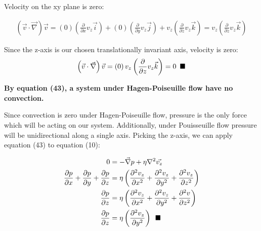 \documentclass[titlepage]{article}
\begin{document}
\noindent Velocity on the xy plane is zero:

\begin{align}
    \left(\vec{v}\cdot\vec{\nabla}\right)\vec{v}=\left(0\right)\left(\displaystyle\frac{\partial}{\partial{x}}v_{z}\vec{i}\right)+\left(0\right)\left(\displaystyle\frac{\partial}{\partial{y}}v_{z}\vec{j}\right)+v_{z}\left(\displaystyle\frac{\partial}{\partial{z}}v_{z}\vec{k}\right) 
    =v_{z}\left(\displaystyle\frac{\partial}{\partial{z}}v_{z}\vec{k}\right) 
\end{align}

\noindent Since the z-axis is our chosen translationally invariant axis, velocity is zero:
\begin{align}
    \left(\vec{v}\cdot\vec{\nabla}\right)\vec{v}=\left(0\right)v_{z}\left(\displaystyle\frac{\partial}{\partial{z}}v_{z}\vec{k}\right)=0\hspace*{5pt}\blacksquare
\end{align}

\noindent \textbf{By equation (43), a system under Hagen-Poiseuille flow have no convection.} 

\newpage
\noindent  Since convection is zero under Hagen-Poiseuille flow, pressure is the only force which will be acting on our system. Additionally, under Pouisseuille flow pressure will be unidirectional along a single axis. Picking the z-axis, we can apply equation (43) to equation (10): 

\begingroup
    \addtolength\jot{5pt}
    \begin{align}
        0&=-\vec{\nabla}p+\eta\nabla^2\vec{v_{z}}\\   
        \displaystyle\frac{\partial{p}}{\partial{x}}+\displaystyle\frac{\partial{p}}{\partial{y}}+\frac{\partial{p}}{\partial{z}}&=\eta\left(\displaystyle\frac{\partial^2{v_{z}}}{\partial{x}^2}+\displaystyle\frac{\partial^2{v_{z}}}{\partial{y}^2}+\displaystyle\frac{\partial^2{v_{z}}}{\partial{z}^2}\right) \\ 
        \displaystyle\frac{\partial{p}}{\partial{z}}&=\eta\left(\frac{\partial^2{v_{z}}}{\partial{x}^2}+\displaystyle\frac{\partial^2{v_{z}}}{\partial{y}^2}+\frac{\partial^2{v}}{\partial{z}^2}\right) \\
    \displaystyle\frac{\partial{p}}{\partial{z}}&=\eta\left(\displaystyle\frac{\partial^2{v_{z}}}{\partial{y}^2}\right)\hspace*{5pt}\blacksquare 
\end{align} \\
\end{document}
